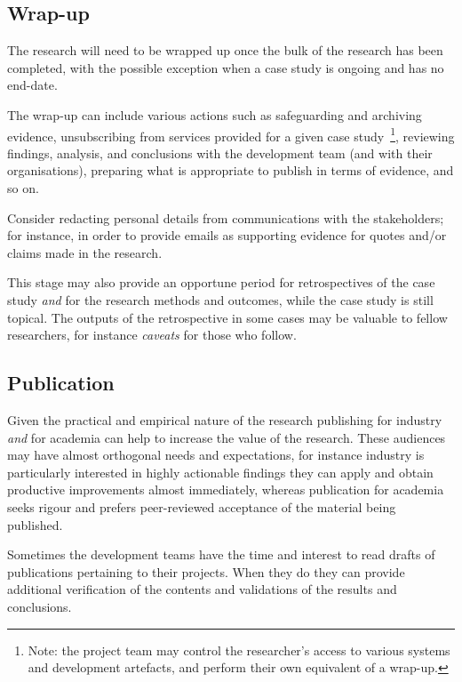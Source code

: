 \subsection{Wrap-up}
The research will need to be wrapped up once the bulk of the research has been completed, with the possible exception when a case study is ongoing and has no end-date. 

The wrap-up can include various actions such as safeguarding and archiving evidence, unsubscribing from services provided for a given case study~\footnote{Note: the project team may control the researcher's access to various systems and development artefacts, and perform their own equivalent of a wrap-up.}, reviewing findings, analysis, and conclusions with the development team (and with their organisations), preparing what is appropriate to publish in terms of evidence, and so on.

Consider redacting personal details from communications with the stakeholders; for instance, in order to provide emails as supporting evidence for quotes and/or claims made in the research.

This stage may also provide an opportune period for retrospectives of the case study \textit{and} for the research methods and outcomes, while the case study is still topical. The outputs of the retrospective in some cases may be valuable to fellow researchers, for instance \emph{caveats} for those who follow. 

\subsection{Publication}
Given the practical and empirical nature of the research publishing for industry \emph{and} for academia can help to increase the value of the research. These audiences may have almost orthogonal needs and expectations, for instance industry is particularly interested in highly actionable findings they can apply and obtain productive improvements almost immediately, whereas publication for academia seeks rigour and prefers peer-reviewed acceptance of the material being published.

Sometimes the development teams have the time and interest to read drafts of publications pertaining to their projects. When they do they can provide additional verification of the contents and validations of the results and conclusions.



